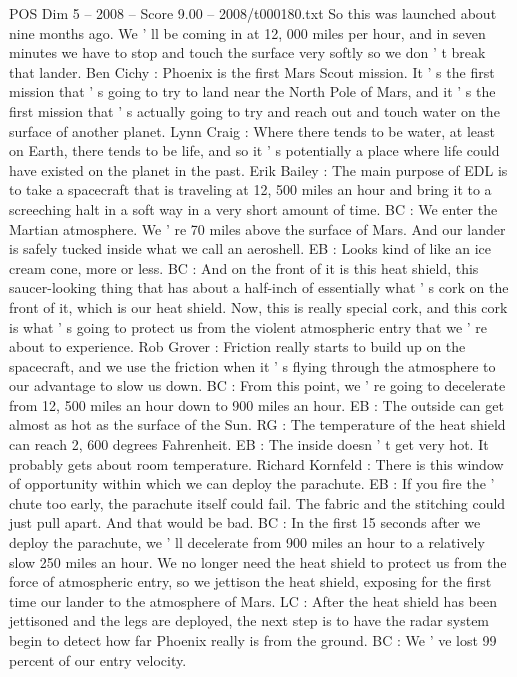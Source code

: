 \begin{textsample}{POS Dim 5 – 2008 – Score 9.00 – 2008/t000180.txt}
So this was launched about nine months ago.
We ' ll be coming in at 12, 000 miles per hour, and in seven minutes we have to stop and touch the surface very softly so we don ' t break that lander.
Ben Cichy : Phoenix is the first Mars Scout mission.
It ' s the first mission that ' s going to try to land near the North Pole of Mars, and it ' s the first mission that ' s actually going to try and reach out and touch water on the surface of another planet.
Lynn Craig : Where there tends to be water, at least on Earth, there tends to be life, and so it ' s potentially a place where life could have existed on the planet in the past.
Erik Bailey : The main purpose of EDL is to take a spacecraft that is traveling at 12, 500 miles an hour and bring it to a screeching halt in a soft way in a very short amount of time.
BC : We enter the Martian atmosphere.
We ' re 70 miles above the surface of Mars.
And our lander is safely tucked inside what we call an aeroshell.
EB : Looks kind of like an ice cream cone, more or less.
BC : And on the front of it is this heat shield, this saucer-looking thing that has about a half-inch of essentially what ' s cork on the front of it, which is our heat shield.
Now, this is really special cork, and this cork is what ' s going to protect us from the violent atmospheric entry that we ' re about to experience.
Rob Grover : Friction really starts to build up on the spacecraft, and we use the friction when it ' s flying through the atmosphere to our advantage to slow us down.
BC : From this point, we ' re going to decelerate from 12, 500 miles an hour down to 900 miles an hour.
EB : The outside can get almost as hot as the surface of the Sun.
RG : The temperature of the heat shield can reach 2, 600 degrees Fahrenheit.
EB : The inside doesn ' t get very hot.
It probably gets about room temperature.
Richard Kornfeld : There is this window of opportunity within which we can deploy the parachute.
EB : If you fire the ' chute too early, the parachute itself could fail.
The fabric and the stitching could just pull apart.
And that would be bad.
BC : In the first 15 seconds after we deploy the parachute, we ' ll decelerate from 900 miles an hour to a relatively slow 250 miles an hour.
We no longer need the heat shield to protect us from the force of atmospheric entry, so we jettison the heat shield, exposing for the first time our lander to the atmosphere of Mars.
LC : After the heat shield has been jettisoned and the legs are deployed, the next step is to have the radar system begin to detect how far Phoenix really is from the ground.
BC : We ' ve lost 99 percent of our entry velocity.

\end{textsample}
